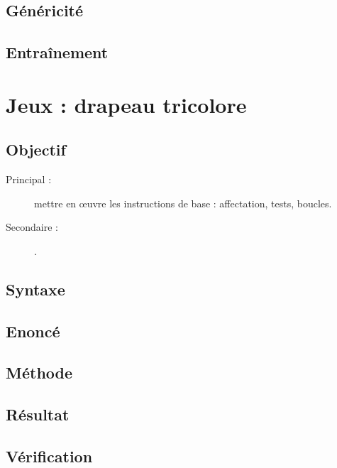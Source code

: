 \subsection{Généricité}\label{instructions:vie-courante:genericite}

\subsection{Entraînement}\label{instructions:vie-courante:entrainement}

\section{Jeux : drapeau tricolore}\label{instructions:jeux}

\subsection{Objectif}\label{instructions:jeux:objectif}
\begin{description}
\item[Principal : ] mettre en \oe uvre les instructions de base : affectation, tests, boucles.
\item[Secondaire :] .
\end{description}


\subsection{Syntaxe \python}\label{instructions:jeux:python}

\subsection{Enoncé}\label{instructions:jeux:enonce}

\subsection{Méthode}\label{instructions:jeux:methode}

\subsection{Résultat}\label{instructions:jeux:resultat}

\subsection{Vérification}\label{instructions:jeux:verification}

